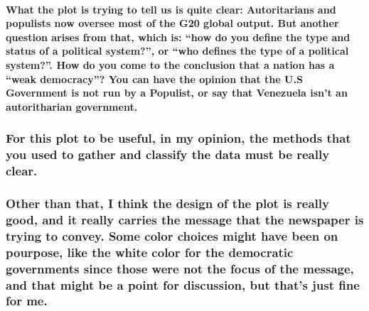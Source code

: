 \documentclass[]{article}
\let\oldparagraph\paragraph
\renewcommand{\paragraph}[1]{\oldparagraph{#1}\mbox{}}
\begin{document}
\paragraph{\texorpdfstring{What the plot is trying to tell us is quite
clear: Autoritarians and populists now oversee most of the G20 global
output. But another question arises from that, which is: ``how do you
define the type and status of a political system?'', or ``who defines
the type of a political system?''. How do you come to the conclusion
that a nation has a ``weak democracy''? You can have the opinion that
the U.S Government is not run by a Populist, or say that Venezuela isn't
an autoritharian
government.}{What the plot is trying to tell us is quite clear: Autoritarians and populists now oversee most of the G20 global output. But another question arises from that, which is: how do you define the type and status of a political system?, or who defines the type of a political system?. How do you come to the conclusion that a nation has a weak democracy? You can have the opinion that the U.S Government is not run by a Populist, or say that Venezuela isn't an autoritharian government.}}\label{what-the-plot-is-trying-to-tell-us-is-quite-clear-autoritarians-and-populists-now-oversee-most-of-the-g20-global-output.-but-another-question-arises-from-that-which-is-how-do-you-define-the-type-and-status-of-a-political-system-or-who-defines-the-type-of-a-political-system.-how-do-you-come-to-the-conclusion-that-a-nation-has-a-weak-democracy-you-can-have-the-opinion-that-the-u.s-government-is-not-run-by-a-populist-or-say-that-venezuela-isnt-an-autoritharian-government.}

\subsubsection{For this plot to be useful, in my opinion, the methods
that you used to gather and classify the data must be really
clear.}\label{for-this-plot-to-be-useful-in-my-opinion-the-methods-that-you-used-to-gather-and-classify-the-data-must-be-really-clear.}

\subsubsection{Other than that, I think the design of the plot is really
good, and it really carries the message that the newspaper is trying to
convey. Some color choices might have been on pourpose, like the white
color for the democratic governments since those were not the focus of
the message, and that might be a point for discussion, but that's just
fine for
me.}\label{other-than-that-i-think-the-design-of-the-plot-is-really-good-and-it-really-carries-the-message-that-the-newspaper-is-trying-to-convey.-some-color-choices-might-have-been-on-pourpose-like-the-white-color-for-the-democratic-governments-since-those-were-not-the-focus-of-the-message-and-that-might-be-a-point-for-discussion-but-thats-just-fine-for-me.}
\end{document}
